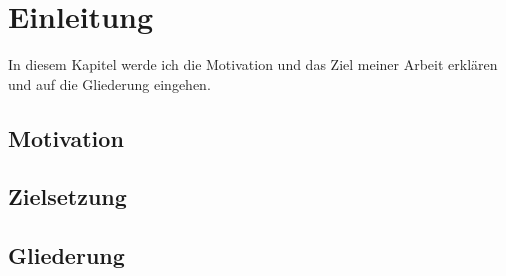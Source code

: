 \chapter{Einleitung}
In diesem Kapitel werde ich die Motivation und das Ziel meiner Arbeit erklären und auf die Gliederung eingehen.

\section{Motivation}

\section{Zielsetzung}

\section{Gliederung}